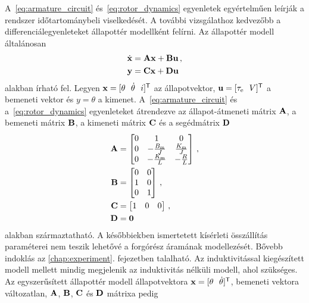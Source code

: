 A~\eqref{eq:armature_circuit} és~\eqref{eq:rotor_dynamics} egyenletek egyértelműen leírják a 
rendszer időtartománybeli viselkedését.
A további vizsgálathoz kedvezőbb a differenciálegyenleteket állapottér modellként felírni.
Az állapottér modell általánosan~\citep{kalman1963mathematical}
\begin{equation}\label{eq:state_space_generic}
\begin{split}
    \dot{\mathbf{x}} &= \mathbf{A} \mathbf{x} + \mathbf{B} \mathbf{u}\,,\\
    \mathbf{y} &= \mathbf{C} \mathbf{x} + \mathbf{D} \mathbf{u}
\end{split}
\end{equation} 
alakban írható fel. Legyen \(\mathbf{x} = [\theta~~\dot \theta~~i]^{\mathsf T}\) az állapotvektor, 
\(\mathbf{u} = [\tau_{\mathrm{e}}~~V]^{\mathsf T}\) a bemeneti vektor és \(y = \theta\) a kimenet.
A~\eqref{eq:armature_circuit} és a~\eqref{eq:rotor_dynamics} egyenleteket átrendezve 
az állapot-átmeneti mátrix \(\mathbf{A}\), a bemeneti mátrix \(\mathbf{B}\), a kimeneti mátrix \(\mathbf{C}\) és a segédmátrix \(\mathbf{D}\) 
\begin{equation}\label{eq:state_space}
    \begin{split}
        \mathbf{A} &= 
        \begin{bmatrix}
            0 & 1 & 0 \\
            0 & -\frac{B_{\mathrm{m}}}{J} & \frac{K_{\mathrm{m}}}{J} \\
            0 & -\frac{K_{\mathrm{m}}}{L} & -\frac{R}{L} \\
        \end{bmatrix}\,,\\
        \mathbf{B} &=
        \begin{bmatrix}
            0 & 0 \\
            1 & 0 \\
            0 & 1 \\
        \end{bmatrix}\,,\\
        \mathbf{C} &=
        \begin{bmatrix}
            1 & 0 & 0 \\
        \end{bmatrix}\,,\\
        \mathbf{D} &= \mathbf{0}
    \end{split}
\end{equation}
alakban származtatható. A későbbiekben ismertetett kísérleti összállítás paraméterei 
nem teszik lehetővé a forgórész áramának modellezését. Bővebb indoklás az \ref{chap:experiment}. 
fejezetben talalható. Az induktivitással kiegészített modell mellett mindig megjelenik az 
induktivitás nélküli modell, ahol szükséges. Az egyszerűsített állapottér modell állapotvektora 
\(\mathbf{x} = [\theta~~\dot \theta]^{\mathsf T}\), bemeneti vektora változatlan, 
\(\mathbf{A}\), \(\mathbf{B}\), \(\mathbf{C}\) és \(\mathbf{D}\) mátrixa pedig 

